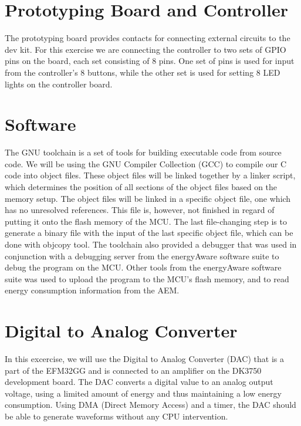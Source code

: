 \section{Prototyping Board and Controller}

The prototyping board provides contacts for connecting external circuits to the
dev kit. \cite{DK3750Manual} For this exercise we are connecting the controller
to two sets of GPIO pins on the board, each set consisting of 8 pins. One set of
pins is used for input from the controller's 8 buttons, while the other set is
used for setting 8 LED lights on the controller board.

\section{Software}

The GNU toolchain is a set of tools for building executable code from source
code. We will be using the GNU Compiler Collection (GCC) to compile our C code
into object files. These object files will be linked together by a linker
script, which determines the position of all sections of the object files based
on the memory setup. The object files will be linked in a specific object file,
one which has no unresolved references. This file is, however, not finished in
regard of putting it onto the flash memory of the MCU. The last file-changing
step is to generate a binary file with the input of the last specific object
file, which can be done with objcopy tool. The toolchain also provided a
debugger that was used in conjunction with a debugging server from the
energyAware software suite to debug the program on the MCU. Other tools from the
energyAware software suite was used to upload the program to the MCU's flash
memory, and to read energy consumption information from the AEM.
\cite{TDT4528Compendium}

\section{Digital to Analog Converter}

In this excercise, we will use the Digital to Analog Converter (DAC) that is a
part of the EFM32GG and is connected to an amplifier on the DK3750 development
board. \cite{TDT4528Compendium} The DAC converts a digital value to an analog
output voltage, using a limited amount of energy and thus maintaining a low
energy consumption. Using DMA (Direct Memory Access) and a timer, the DAC should
be able to generate waveforms without any CPU intervention. \cite{EFM32GGManual}

